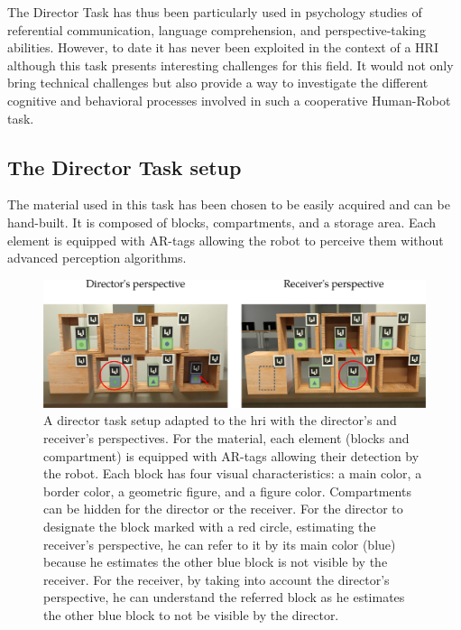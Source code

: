 \documentclass[a4paper,11pt,twoside]{StyleThese}
\begin{document}
The Director Task has thus been particularly used in psychology studies of referential communication, language comprehension, and perspective-taking abilities. However, to date it has never been exploited in the context of a HRI although this task presents interesting challenges for this field. It would not only bring technical challenges but also provide a way to investigate the different cognitive and behavioral processes involved in such a cooperative Human-Robot task.

\subsection{The Director Task setup}\label{chap9:subsec:material}

The material used in this task has been chosen to be easily acquired and can be hand-built. It is composed of blocks, compartments, and a storage area. Each element is equipped with AR-tags allowing the robot to perceive them without advanced perception algorithms.

\begin{figure}[ht!]
	\centering
	\includegraphics[width=\textwidth]{figures/chapter4/setup.png}
	\caption{\label{chap9:fig:setup} A director task setup adapted to the \acrshort{hri} with the director's and receiver's perspectives. For the material, each element (blocks and compartment) is equipped with AR-tags allowing their detection by the robot. Each block has four visual characteristics: a main color, a border color, a geometric figure, and a figure color. Compartments can be hidden for the director or the receiver. For the director to designate the block marked with a red circle, estimating the receiver's perspective, he can refer to it by its main color (blue) because he estimates the other blue block is not visible by the receiver. For the receiver, by taking into account the director's perspective, he can understand the referred block as he estimates the other blue block to not be visible by the director.}
\end{figure}
\end{document}
